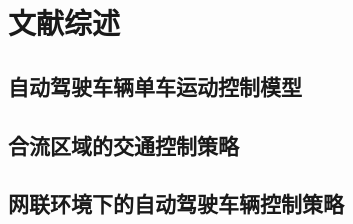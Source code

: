 \chapter{文献综述}
\label{cha:review}

\section{自动驾驶车辆单车运动控制模型}


\section{合流区域的交通控制策略}


\section{网联环境下的自动驾驶车辆控制策略}







